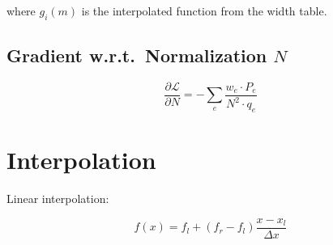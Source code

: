 \documentclass[12pt,a4paper]{article}
\begin{document}
where $g_i(m)$ is the interpolated function from the width table.

\subsection{Gradient w.r.t.\ Normalization $N$}

\begin{equation}
\frac{\partial \mathcal{L}}{\partial N} = -\sum_e \frac{w_e \cdot P_e}{N^2 \cdot q_e}
\end{equation}

\section{Interpolation}

Linear interpolation:

\begin{equation}
f(x) = f_l + (f_r - f_l) \frac{x - x_l}{\Delta x}
\end{equation}
\end{document}

